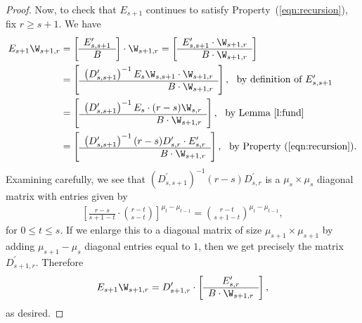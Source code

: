 \begin{proof}
Now, to check that $E_{s+1}$ continues to satisfy Property~(\ref{eqn:recursion}), fix $r \geq s+1$.  We have
\begin{align*}
    E_{s+1} \W_{s+1,r} &= \left [\begin{array}{c} E_{s, s+1}^{\prime}\\ \hline
    B
    \end{array} \right ] \cdot \W_{s+1,r}
    = 
    \left [\begin{array}{r} E_{s, s+1}^{\prime} \cdot \W_{s+1,r} \\ \hline
    B \cdot \W_{s+1,r} 
    \end{array} \right ]\\
    &= 
    \left [\begin{array}{r} \left ( D_{s,s+1}^{\prime} \right )^{-1} E_{s} \W_{s,s+1} \cdot \W_{s+1,r} \\ \hline
    B \cdot \W_{s+1,r} 
    \end{array} \right ],\ \mbox{ by definition of $E_{s, s+1}^{\prime}$}\\
    &= 
    \left [\begin{array}{r} \left ( D_{s,s+1}^{\prime} \right )^{-1} E_{s} \cdot (r-s) \W_{s,r} \\ \hline
    B \cdot \W_{s+1,r} 
    \end{array} \right ],\ \mbox{ by Lemma \ref{l:fund}}\\
    &= 
    \left [\begin{array}{r} \left ( D_{s,s+1}^{\prime} \right )^{-1}  (r-s) D_{s,r}^{\prime} \cdot E_{s,r}^{\prime} \\ \hline
    B \cdot \W_{s+1,r} 
    \end{array} \right ],\ \mbox{ by Property~(\ref{eqn:recursion}).}
\end{align*}
Examining carefully, we see that $\left (D_{s,s+1}^{\prime} \right )^{-1}  (r-s) D_{s,r}^{\prime}$ is a $\mu_{s} \times \mu_{s}$ diagonal matrix with entries given by
\begin{align*}
\left[ \frac{r-s}{s+1-t} \cdot \binom{r - t}{s - t} \right]^{\mu_{t}-\mu_{t-1}} 
= \binom{r - t}{s +1 - t}^{\mu_{t}-\mu_{t-1}},
\end{align*}
for $0 \leq t \leq s$.  If we enlarge this to a diagonal matrix of size $\mu_{s+1} \times \mu_{s+1}$ by adding $\mu_{s+1} - \mu_{s}$ diagonal entries equal to $1$, then we get precisely the matrix $D_{s+1,r}^{\prime}$.  Therefore
\[
E_{s+1} \W_{s+1,r} = D_{s+1,r}^{\prime} \cdot \left [\begin{array}{c} E_{s,r}^{\prime} \\ \hline
    B \cdot \W_{s+1,r} 
    \end{array} \right ],
\]
as desired.


\end{proof}
